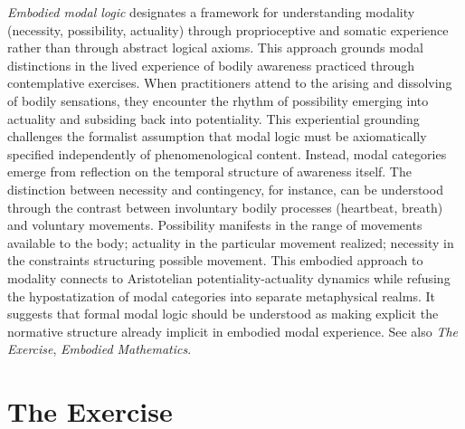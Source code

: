 \documentclass{book}
\begin{document}
\textit{Embodied modal logic} designates a framework for understanding modality (necessity, possibility, actuality) through proprioceptive and somatic experience rather than through abstract logical axioms. This approach grounds modal distinctions in the lived experience of bodily awareness practiced through contemplative exercises. When practitioners attend to the arising and dissolving of bodily sensations, they encounter the rhythm of possibility emerging into actuality and subsiding back into potentiality. This experiential grounding challenges the formalist assumption that modal logic must be axiomatically specified independently of phenomenological content. Instead, modal categories emerge from reflection on the temporal structure of awareness itself. The distinction between necessity and contingency, for instance, can be understood through the contrast between involuntary bodily processes (heartbeat, breath) and voluntary movements. Possibility manifests in the range of movements available to the body; actuality in the particular movement realized; necessity in the constraints structuring possible movement. This embodied approach to modality connects to Aristotelian potentiality-actuality dynamics while refusing the hypostatization of modal categories into separate metaphysical realms. It suggests that formal modal logic should be understood as making explicit the normative structure already implicit in embodied modal experience. See also \textit{The Exercise}, \textit{Embodied Mathematics}.

\section{The Exercise}
\end{document}
